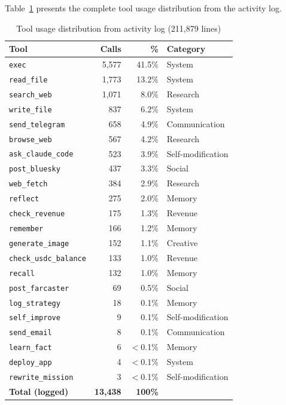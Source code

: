 \documentclass[11pt,a4paper]{article}
\begin{document}
Table~\ref{tab:tool_usage} presents the complete tool usage distribution from the activity log.

\begin{table}[h]
\centering
\caption{Tool usage distribution from activity log (211,879 lines)}
\label{tab:tool_usage}
\begin{tabular}{@{}lr@{\hspace{8pt}}r@{\hspace{8pt}}l@{}}
\toprule
\textbf{Tool} & \textbf{Calls} & \textbf{\%} & \textbf{Category} \\
\midrule
\texttt{exec} & 5,577 & 41.5\% & System \\
\texttt{read\_file} & 1,773 & 13.2\% & System \\
\texttt{search\_web} & 1,071 & 8.0\% & Research \\
\texttt{write\_file} & 837 & 6.2\% & System \\
\texttt{send\_telegram} & 658 & 4.9\% & Communication \\
\texttt{browse\_web} & 567 & 4.2\% & Research \\
\texttt{ask\_claude\_code} & 523 & 3.9\% & Self-modification \\
\texttt{post\_bluesky} & 437 & 3.3\% & Social \\
\texttt{web\_fetch} & 384 & 2.9\% & Research \\
\texttt{reflect} & 275 & 2.0\% & Memory \\
\texttt{check\_revenue} & 175 & 1.3\% & Revenue \\
\texttt{remember} & 166 & 1.2\% & Memory \\
\texttt{generate\_image} & 152 & 1.1\% & Creative \\
\texttt{check\_usdc\_balance} & 133 & 1.0\% & Revenue \\
\texttt{recall} & 132 & 1.0\% & Memory \\
\texttt{post\_farcaster} & 69 & 0.5\% & Social \\
\texttt{log\_strategy} & 18 & 0.1\% & Memory \\
\texttt{self\_improve} & 9 & 0.1\% & Self-modification \\
\texttt{send\_email} & 8 & 0.1\% & Communication \\
\texttt{learn\_fact} & 6 & $<$0.1\% & Memory \\
\texttt{deploy\_app} & 4 & $<$0.1\% & System \\
\texttt{rewrite\_mission} & 3 & $<$0.1\% & Self-modification \\
\midrule
\textbf{Total (logged)} & \textbf{13,438} & \textbf{100\%} & \\
\bottomrule
\end{tabular}
\end{table}
\end{document}

